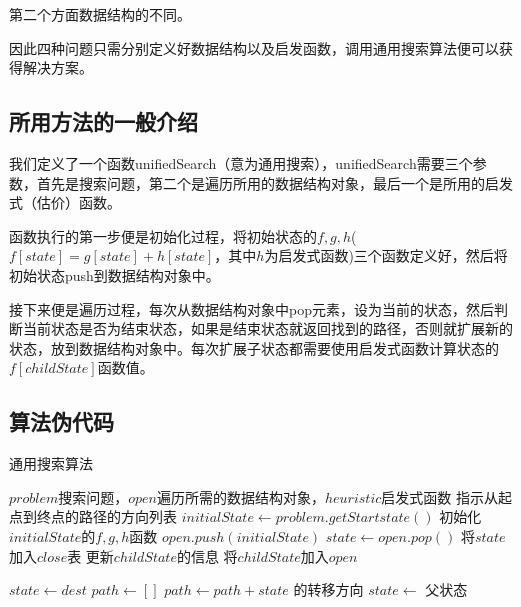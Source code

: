 \documentclass[forprint]{WHUBachelor}
\begin{document}
第二个方面数据结构的不同。

因此四种问题只需分别定义好数据结构以及启发函数，调用通用搜索算法便可以获得解决方案。

\subsection{所用方法的一般介绍}

我们定义了一个函数unifiedSearch（意为通用搜索），unifiedSearch需要三个参数，首先是搜索问题，第二个是遍历所用的数据结构对象，最后一个是所用的启发式（估价）函数。

函数执行的第一步便是初始化过程，将初始状态的$f,g,h$($f[state]=g[state]+h[state]$，其中$h$为启发式函数)三个函数定义好，然后将初始状态push到数据结构对象中。

接下来便是遍历过程，每次从数据结构对象中pop元素，设为当前的状态，然后判断当前状态是否为结束状态，如果是结束状态就返回找到的路径，否则就扩展新的状态，放到数据结构对象中。每次扩展子状态都需要使用启发式函数计算状态的$f[childState]$函数值。

\subsection{算法伪代码}

\renewcommand{\algorithmicrequire}{\textbf{输入:}}
\renewcommand{\algorithmicensure}{\textbf{输出:}}
\begin{algorithm}[H]
  \caption{通用搜索算法}
  \begin{algorithmic}[1] %
    \Require $problem$搜索问题，$open$遍历所需的数据结构对象，$heuristic$启发式函数
    \Ensure 指示从起点到终点的路径的方向列表
    \State $initialState \gets problem.getStartstate()$
    \State 初始化$initialState$的$f,g,h$函数
    \State $open.push(initialState)$
    \State $state \gets open.pop()$
    \State 将$state$加入$close$表
    \State {}
    \EndIf
    \State 更新$childState$的信息
    \State 将$childState$加入$open$
    \EndFor
    \EndWhile

    \State $state \gets dest$
    \State $path \gets []$
    \State $path \gets path + state$ 的转移方向
    \State $state \gets $ 父状态
    \EndWhile
    \State {}
    \EndFunction
  \end{algorithmic}
\end{algorithm}
\end{document}
